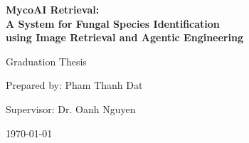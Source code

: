 \begin{titlepage}
    \centering
    \vspace*{1cm}

    {\Huge \textbf{MycoAI Retrieval: \\ A System for Fungal Species Identification \\ using Image Retrieval and Agentic Engineering} \par}
    \vspace{2cm}

    {\Large Graduation Thesis \par}
    \vspace{1cm}

    {\large Prepared by: Pham Thanh Dat \par}
    \vspace{0.5cm}
    {\large Supervisor: Dr. Oanh Nguyen \par}
    \vspace{2cm}

    \vfill
    {\large \today \par}
\end{titlepage}
